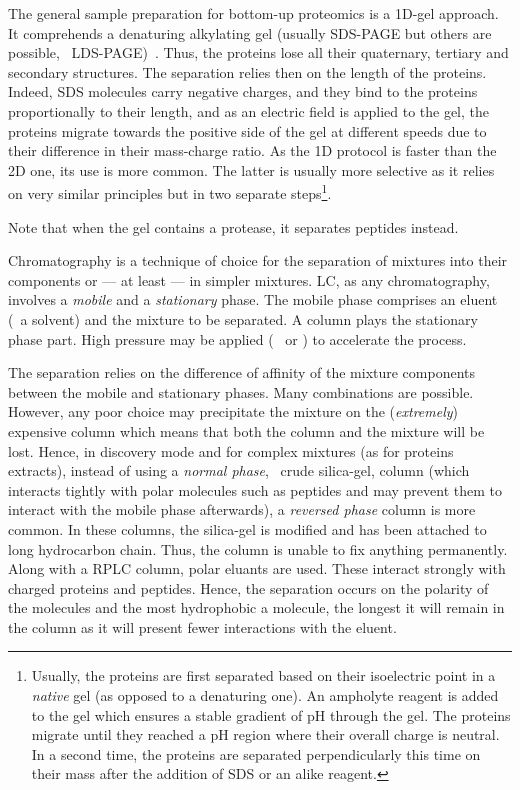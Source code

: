 The general sample preparation for bottom-up proteomics is a 1D-gel approach.
It comprehends a denaturing alkylating gel (usually \gls{SDS-PAGE} but others are
possible, \eg\ \gls{LDS-PAGE})~. Thus, the proteins lose
all their quaternary, tertiary and secondary structures. The separation relies
then on the length of the proteins. Indeed, \gls{SDS} molecules carry negative
charges, and they bind to the proteins proportionally to their length, and as an
electric field is applied to the gel, the proteins migrate towards the positive
side of the gel at different speeds due to their difference in their mass-charge
ratio. As the 1D protocol is faster than the 2D one, its use is more common. The latter is
usually more selective as it relies on very similar principles but in two separate
steps\footnote{Usually, the proteins are first separated based on their
isoelectric point in a \emph{native} gel (as opposed to a denaturing one).
An \gls{ampholyte} reagent is added to the gel which ensures a stable
gradient of \gls{pH} through the gel. The proteins migrate until they reached a
\gls{pH} region where their overall charge is neutral. In a second time, the
proteins are separated perpendicularly this time on their mass after the addition
of \gls{SDS} or an alike reagent.}.

Note that when the gel contains a protease, it separates peptides instead.


\vspace{-0.5mm}
Chromatography is a technique of choice for the separation of mixtures into their
components or --- at least --- in simpler mixtures. \gls{LC}, as any
chromatography, involves a \emph{mobile} and a \emph{stationary} phase.
The mobile phase comprises an eluent (\ie\ a solvent) and the mixture to be
separated. A column plays the stationary phase part.
High pressure may be applied (\eg\  or )
to accelerate the process.

\vspace{-0.5mm}
The separation relies on the difference of affinity of the mixture components
between the mobile and stationary phases. Many combinations are possible. However,
any poor choice may precipitate the mixture on the (\emph{extremely})
expensive column which means that both the column and the mixture will be lost.
Hence, in discovery mode and for complex mixtures (as for proteins extracts),
instead of using a \emph{normal phase}, \ie\ crude silica-gel, column (which
interacts tightly with polar molecules such as peptides and may prevent them to
interact with the mobile phase afterwards), a \emph{reversed phase} column
is more common. In these columns, the silica-gel is modified and has been
attached to long hydrocarbon chain. Thus, the column is unable to fix anything
permanently. Along with a \gls{RPLC} column, polar eluants are used. These
interact strongly with charged proteins and peptides. Hence, the separation
occurs on the polarity of the molecules and the most hydrophobic a molecule,
the longest it will remain in the column as it will present fewer interactions
with the eluent.

